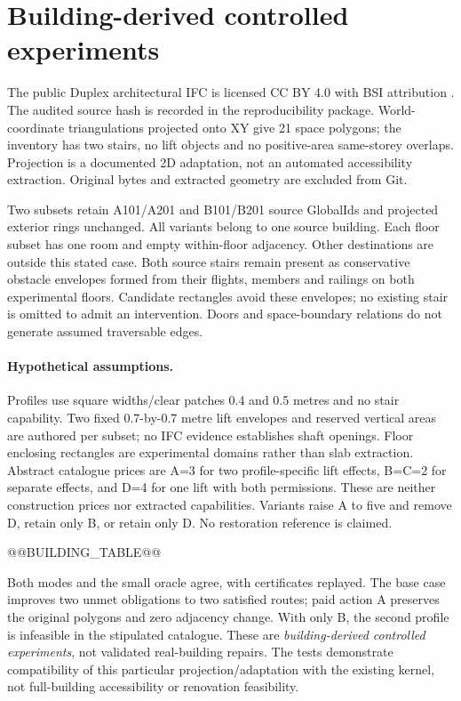 \documentclass[10pt]{article}
\begin{document}
\section{Building-derived controlled experiments}
The public Duplex architectural IFC is licensed CC BY 4.0 with BSI attribution \cite{duplex}. The audited source hash is recorded in the reproducibility package. World-coordinate triangulations projected onto XY give 21 space polygons; the inventory has two stairs, no lift objects and no positive-area same-storey overlaps. Projection is a documented 2D adaptation, not an automated accessibility extraction. Original bytes and extracted geometry are excluded from Git.

Two subsets retain A101/A201 and B101/B201 source GlobalIds and projected exterior rings unchanged. All variants belong to one source building. Each floor subset has one room and empty within-floor adjacency. Other destinations are outside this stated case. Both source stairs remain present as conservative obstacle envelopes formed from their flights, members and railings on both experimental floors. Candidate rectangles avoid these envelopes; no existing stair is omitted to admit an intervention. Doors and space-boundary relations do not generate assumed traversable edges.

\paragraph{Hypothetical assumptions.}
Profiles use square widths/clear patches 0.4 and 0.5 metres and no stair capability. Two fixed 0.7-by-0.7 metre lift envelopes and reserved vertical areas are authored per subset; no IFC evidence establishes shaft openings. Floor enclosing rectangles are experimental domains rather than slab extraction. Abstract catalogue prices are A=3 for two profile-specific lift effects, B=C=2 for separate effects, and D=4 for one lift with both permissions. These are neither construction prices nor extracted capabilities. Variants raise A to five and remove D, retain only B, or retain only D. No restoration reference is claimed.

@@BUILDING_TABLE@@

Both modes and the small oracle agree, with certificates replayed. The base case improves two unmet obligations to two satisfied routes; paid action A preserves the original polygons and zero adjacency change. With only B, the second profile is infeasible in the stipulated catalogue. These are \emph{building-derived controlled experiments}, not validated real-building repairs. The tests demonstrate compatibility of this particular projection/adaptation with the existing kernel, not full-building accessibility or renovation feasibility.
\end{document}
